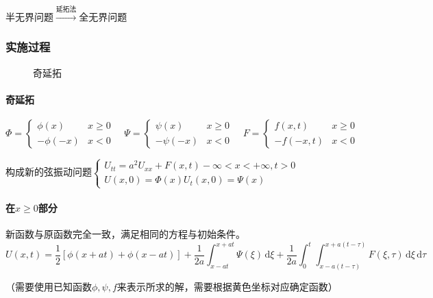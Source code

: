 半无界问题\(\xrightarrow{\text{延拓法}}\)全无界问题

\subsubsection{实施过程}

\begin{figure}[htbp]
    \centering
    \caption{奇延拓}\label{pic:cont}
\end{figure}

\paragraph{奇延拓}\[\Phi=\begin{cases}\phi(x)&x\geq0\\-\phi(-x)&x<0\end{cases}\quad\Psi=\begin{cases}\psi(x)&x\geq0\\-\psi(-x)&x<0\end{cases}\quad F=\begin{cases}f(x,t)&x\geq0\\-f(-x,t)&x<0\end{cases}\]

构成新的弦振动问题\(\begin{cases}U_{tt}=a^2U_{xx}+F(x,t)-\infty<x<+\infty,t>0\\U(x,0)=\Phi(x)U_t(x,0)=\Psi(x)\end{cases}\)

\paragraph{在\(x\geq0\)部分}新函数与原函数完全一致，满足相同的方程与初始条件。
\[
U(x,t)=\frac{1}{2}[\phi(x+at)+\phi(x-at)]+\frac{1}{2a}\int_{x-at}^{x+at}{\Psi(\xi)\,\mathrm{d}\xi}+\frac{1}{2a}\int_{0}^{t}{\int_{x-a(t-\tau)}^{x+a(t-\tau)}F\left(\xi,\tau\right)\,\mathrm{d}\xi \,\mathrm{d}\tau} 
\]

（需要使用已知函数\(\phi,\psi,f\)来表示所求的解，需要根据黄色坐标对应确定函数）

